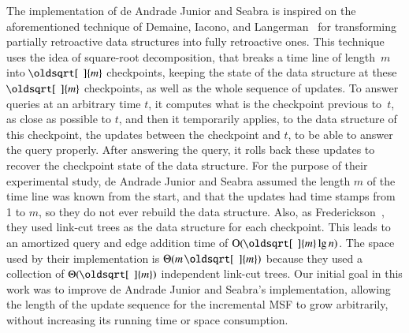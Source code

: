 \documentclass[3p,times,procedia]{elsarticle}
\renewcommand{\sqrt}[2][\mkern8mu]{\mkern-1mu\mathop{\oldsqrt[#1]{#2}}}
\newcommand{\Oh}{\mathrm{O}}
\begin{document}
The implementation of de Andrade Junior and Seabra is inspired on the
aforementioned technique of Demaine, Iacono, and Langerman~\cite[Theorem~5]{DemaineIL2007}
for transforming partially retroactive data structures into fully retroactive ones.
This technique uses the idea of square-root decomposition, that breaks a time line 
of length~$m$ into $\sqrt{m}$ checkpoints, keeping the state of the data structure 
at these $\sqrt{m}$ checkpoints, as well as the whole sequence of updates.  
To answer queries at an arbitrary time $t$, 
it computes what is the checkpoint previous to~$t$, as close as possible to $t$, 
and then it temporarily applies, to the data structure of this checkpoint, 
the updates between the checkpoint and $t$, to be able to answer the query properly.  
After answering the query, 
it rolls back these updates to recover the checkpoint state of the data structure.  
For the purpose of their experimental study, de Andrade Junior and Seabra assumed
the length $m$ of the time line was known from the start, and that the updates
had time stamps from 1 to $m$, so they do not ever rebuild the data structure.
Also, as Frederickson~\cite{Frederickson1983}, 
they used link-cut trees as the data structure for each checkpoint.  
This leads to an amortized query and edge addition time of $\Oh(\sqrt{m}\lg n)$.  
The space used by their implementation is $\Theta(m\sqrt{m})$ 
because they used a collection of $\Theta(\sqrt{m})$ independent link-cut trees. 
Our initial goal in this work was to improve de Andrade Junior and Seabra's 
implementation, allowing the length of the update sequence for the incremental 
MSF to grow arbitrarily, without increasing its running time or space consumption.
\end{document}
